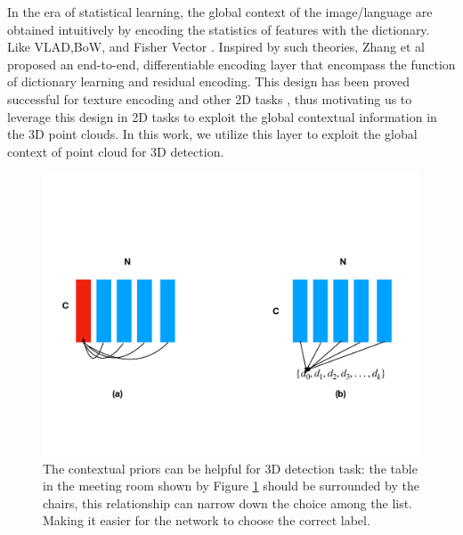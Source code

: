 \documentclass[runningheads]{llncs}
\begin{document}
In the era of statistical learning, the global context of the image/language are obtained intuitively by encoding the statistics of features with the dictionary. Like VLAD\cite{VLAD},BoW\cite{BoW1,BoW2,BoW3,BoW4}, and Fisher Vector \cite{FisherVector1,FisherVector2}. Inspired by such theories, Zhang et al proposed an end-to-end,  differentiable encoding layer \cite{DeepTEN} that encompass the function of dictionary learning and  residual encoding. This design has been proved successful for texture encoding \cite{DeepTEN} and other 2D tasks \cite{encnet,pascal,ImageNet}, thus  motivating us to leverage this design in 2D tasks to exploit the global contextual information in the 3D point clouds. In this work, we utilize this layer to exploit the global context of point cloud for 3D detection.
\begin{figure}[t]
\label{fig:Flyer}
			\begin{minipage}{1\textwidth}
				\centering
				\includegraphics[width=1.1\linewidth]{eccv2020kit/Figure/Flyer.pdf}
			\end{minipage}
    \caption{The contextual priors can be helpful for 3D detection task: the table in the meeting room shown by Figure \ref{fig:Flyer}  should be surrounded by the chairs, this relationship can narrow down the choice among the list. Making it easier for the network to choose the correct label.}
    
\end{figure}
 
\end{document}
